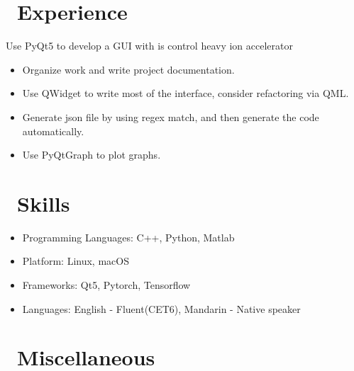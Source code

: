 \documentclass{resume}
\begin{document}
\section{\faUsers\ Experience}
Use PyQt5 to develop a GUI with is control heavy ion accelerator
\begin{itemize}
  \item Organize work and write project documentation.
  \item Use QWidget to write most of the interface, consider refactoring via QML.
  \item Generate json file by using regex match, and then generate the code automatically.
  \item Use PyQtGraph to plot graphs.
\end{itemize}


\section{\faCogs\ Skills}
\begin{itemize}[parsep=0.5ex]
  \item Programming Languages: C++, Python, Matlab
  \item Platform: Linux, macOS
  \item Frameworks: Qt5, Pytorch, Tensorflow
  \item Languages: English - Fluent(CET6), Mandarin - Native speaker
\end{itemize}

\section{\faInfo\ Miscellaneous}

%
%
\end{document}
